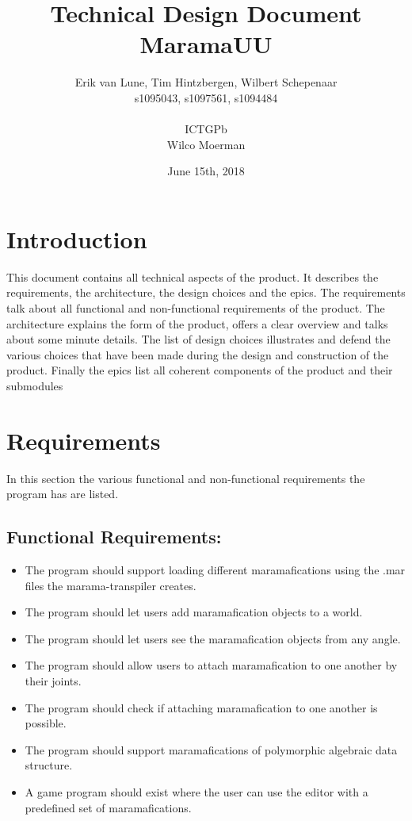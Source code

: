 \documentclass[10pt]{extarticle} %
\title{\huge Technical Design Document MaramaUU}
\author{Erik van Lune, Tim Hintzbergen, Wilbert Schepenaar   \\s1095043, s1097561, s1094484
\\\\ICTGPb
\\Wilco Moerman}
\date{June 15th, 2018}
\begin{document}
    \maketitle
    \thispagestyle{empty}
    \newpage
    \newpage
    \setcounter{page}{1}
    \section {Introduction}
    This document contains all technical aspects of the product.
    It describes the requirements, the architecture, the design choices and the epics.
    The requirements talk about all functional and non-functional requirements of the product.
    The architecture explains the form of the product, offers a clear overview and talks about some minute details.
    The list of design choices illustrates and defend the various choices that have been made during the design and construction of the product.
    Finally the epics list all coherent components of the product and their submodules
    \newpage

    \tableofcontents{}
    \newpage

    \section{Requirements}
    In this section the various functional and non-functional requirements the program has are listed.
    \subsection{Functional Requirements:}
    \begin{itemize}
        \item The program should support loading different maramafications using the .mar files the marama-transpiler creates.
        \item The program should let users add maramafication objects to a world.
        \item The program should let users see the maramafication objects from any angle.
        \item The program should allow users to attach maramafication to one another by their joints.
        \item The program should check if attaching maramafication to one another is possible.
        \item The program should support maramafications of polymorphic algebraic data structure.
        \item A game program should exist where the user can use the editor with a predefined set of maramafications.
    \end{itemize}
\end{document}
